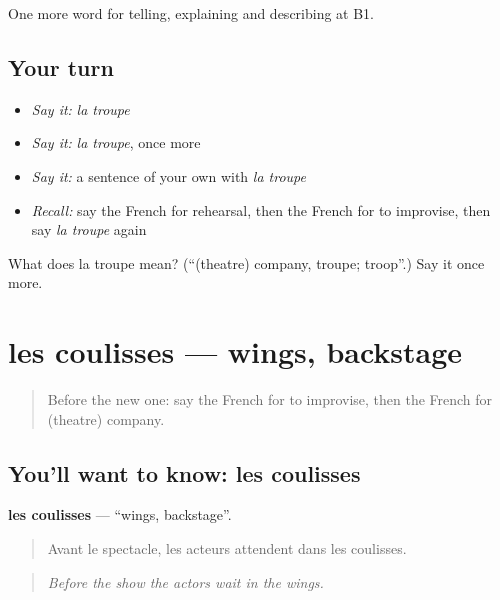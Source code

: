 \begin{grammarlens}[title={What you've built}]
One more word for telling, explaining and describing at B1.
\end{grammarlens}

\subsection*{Your turn}
\begin{itemize}
\raggedright
  \item \emph{Say it:} \emph{la troupe}
  \item \emph{Say it:} \emph{la troupe}, once more
  \item \emph{Say it:} a sentence of your own with \emph{la troupe}
  \item \emph{Recall:} say the French for rehearsal, then the French for to improvise, then say \emph{la troupe} again
\end{itemize}

\begin{tcolorbox}[breakable,colback=teal!4,colframe=teal!35!black,title={Before you move on}]
What does la troupe mean? (\textquotedblleft{}(theatre) company, troupe; troop\textquotedblright{}.) Say it once more.
\end{tcolorbox}
\section[les coulisses]{les coulisses — wings, backstage}

\label{lesson:FR-C514-coulisses}



\begin{quote}
Before the new one: say the French for to improvise, then the French for (theatre) company.
\end{quote}

\subsection*{You'll want to know: les coulisses}
\textbf{les coulisses} — \textquotedblleft{}wings, backstage\textquotedblright{}.

\begin{quote}
Avant le spectacle, les acteurs attendent dans les coulisses.
\end{quote}

\begin{quote}
\emph{Before the show the actors wait in the wings.}
\end{quote}

